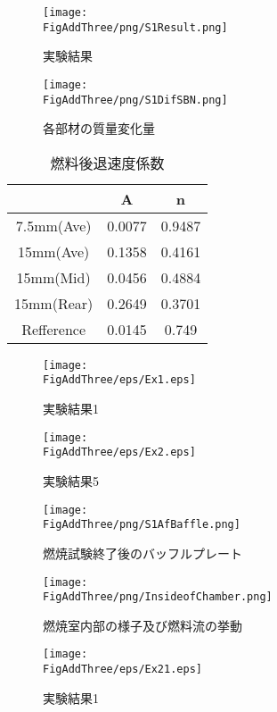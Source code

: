 \begin{figure}
\centering
\caption{実験結果}
\texttt{[image: \\FigAddThree/png/S1Result.png]}
\label{tab:S1Result}
\end{figure}

\begin{figure}
\centering
\caption{各部材の質量変化量}
\texttt{[image: \\FigAddThree/png/S1DifSBN.png]}
\label{tab:S1DifSBN}
\end{figure}

\begin{table}[htb]
\begin{center}
\caption{燃料後退速度係数}
\small
\begin{tabular}{|c|c|c|} \hline
				& A		& n		\\ \hline
7.5mm(Ave) 	& 0.0077	& 0.9487	\\ \hline
15mm(Ave) 	& 0.1358	& 0.4161	\\ \hline
15mm(Mid) 	& 0.0456	& 0.4884	\\ \hline
15mm(Rear) 	& 0.2649	& 0.3701	\\ \hline
Refference 	& 0.0145	& 0.749 	\\ \hline
\end{tabular}
\label{tab:S3RegressionRate}
\end{center}
\end{table}

\begin{figure}
\centering
\texttt{[image: \\FigAddThree/eps/Ex1.eps]}
\caption{実験結果1}
\label{fig:S1Case1}
\end{figure}

\begin{figure}
\centering
\texttt{[image: \\FigAddThree/eps/Ex2.eps]}
\caption{実験結果5}
\label{fig:S1Case5}
\end{figure}

\begin{figure}
\centering
\texttt{[image: \\FigAddThree/png/S1AfBaffle.png]}
\caption{燃焼試験終了後のバッフルプレート}
\label{fig:S1AfBaffle}
\end{figure}

\begin{figure}
\centering
\texttt{[image: \\FigAddThree/png/InsideofChamber.png]}
\caption{燃焼室内部の様子及び燃料流の挙動}
\label{fig:InsideofChamber}
\end{figure}


\begin{figure}
\centering
\texttt{[image: \\FigAddThree/eps/Ex21.eps]}
\caption{実験結果1}                                
\label{fig:S2Case1}                                
\end{figure}                                       

